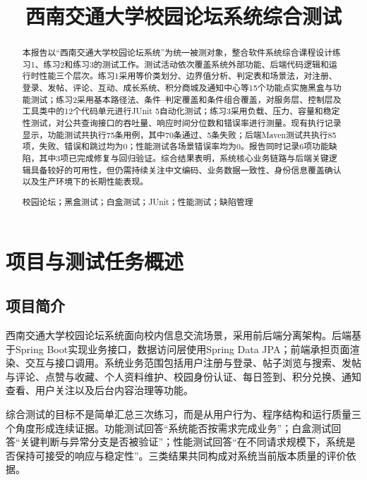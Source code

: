 \documentclass[bwprint]{report}
\title{西南交通大学校园论坛系统综合测试}
\begin{document}
\maketitle
\newpage
\pagestyle{plain}

\begin{abstract}
本报告以“西南交通大学校园论坛系统”为统一被测对象，整合软件系统综合课程设计练习1、练习2和练习3的测试工作。测试活动依次覆盖系统外部功能、后端代码逻辑和运行时性能三个层次。练习1采用等价类划分、边界值分析、判定表和场景法，对注册、登录、发帖、评论、互动、成长系统、积分商城及通知中心等15个功能点实施黑盒与功能测试；练习2采用基本路径法、条件--判定覆盖和条件组合覆盖，对服务层、控制层及工具类中的12个代码单元进行JUnit 5自动化测试；练习3采用负载、压力、容量和稳定性测试，对公共查询接口的吞吐量、响应时间分位数和错误率进行测量。现有执行记录显示，功能测试共执行75条用例，其中70条通过、5条失败；后端Maven测试共执行85项，失败、错误和跳过均为0；性能测试各场景错误率均为0。报告同时记录6项功能缺陷，其中3项已完成修复与回归验证。综合结果表明，系统核心业务链路与后端关键逻辑具备较好的可用性，但仍需持续关注中文编码、业务数据一致性、身份信息覆盖确认以及生产环境下的长期性能表现。

\vspace{0.5em}
校园论坛；黑盒测试；白盒测试；JUnit；性能测试；缺陷管理
\end{abstract}

\tableofcontents
\newpage
\setcounter{page}{1}

\section{项目与测试任务概述}

\subsection{项目简介}
西南交通大学校园论坛系统面向校内信息交流场景，采用前后端分离架构。后端基于Spring Boot实现业务接口，数据访问层使用Spring Data JPA；前端承担页面渲染、交互与接口调用。系统业务范围包括用户注册与登录、帖子浏览与搜索、发帖与评论、点赞与收藏、个人资料维护、校园身份认证、每日签到、积分兑换、通知查看、用户关注以及后台内容治理等功能。

综合测试的目标不是简单汇总三次练习，而是从用户行为、程序结构和运行质量三个角度形成连续证据。功能测试回答“系统能否按需求完成业务”；白盒测试回答“关键判断与异常分支是否被验证”；性能测试回答“在不同请求规模下，系统是否保持可接受的响应与稳定性”。三类结果共同构成对系统当前版本质量的评价依据。
\end{document}
